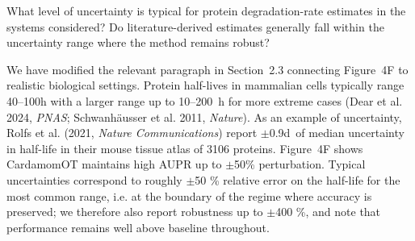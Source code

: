 \documentclass[11pt,a4paper]{article}
\newcounter{revtotal}   %
\newcounter{revlocal}   %
\newcommand{\currentreviewer}{}  %
\newcommand{\revcomment}[2]{%
  \stepcounter{revtotal}%
  \stepcounter{revlocal}%
  \edef\commentlabel{\currentreviewer.\arabic{revlocal}}%
  \begin{tcolorbox}[revstyle,
      title={\commentlabel\ $|$\ #1}]
    #2
  \end{tcolorbox}%
  \edef\lastcommentlabel{\commentlabel}%
}
\newcommand{\response}[1]{%
  \begin{tcolorbox}[respstyle,
      title={Response to \lastcommentlabel}]
    #1
  \end{tcolorbox}%
}
\begin{document}
\revcomment{Accuracy and availability of kinetic parameters in realistic applications}{%
What level of uncertainty is typical for protein degradation-rate estimates in the systems
considered? Do literature-derived estimates generally fall within the uncertainty range
where the method remains robust?}
\response{%
We have modified the relevant paragraph in Section~2.3 connecting Figure~4F to realistic biological
settings. Protein half-lives in mammalian cells typically range 40--100h with a larger range up to 10--200~h for more extreme cases (Dear et al. 2024, \textit{PNAS}; Schwanh\"{a}usser et al. 2011,
\textit{Nature}). As an example of uncertainty, Rolfs et al. (2021, \textit{Nature Communications}) report $\pm$0.9d\ of median uncertainty in half-life in their mouse tissue atlas of 3106 proteins. Figure~4F shows CardamomOT maintains high AUPR
up to $\pm$50\% perturbation. Typical uncertainties correspond to roughly $\pm$50 \% relative error on the half-life for the most common range, i.e. at the boundary of the regime where accuracy is preserved; we therefore also report robustness up to $\pm$400 \%, and note that performance remains well above baseline throughout.}
\end{document}

